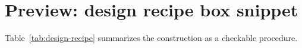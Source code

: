 \documentclass[aps,physrev,reprint,amsmath,amssymb,floatfix]{revtex4-2}
\begin{document}
\section*{Preview: design recipe box snippet}
Table~\ref{tab:design-recipe} summarizes the construction as a checkable
procedure.

\end{document}
